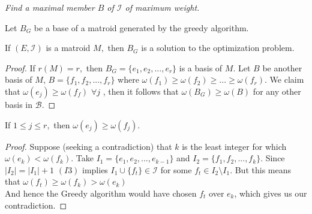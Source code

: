 \documentclass[../main.tex]{subfiles}
\begin{document}
\noindent\Problem \textit{Find a maximal member $B$ of $\mathcal{I}$ of maximum weight.}
\begin{note}
Let $B_G$ be a base of a matroid generated by the greedy algorithm.
\end{note}
\begin{thm}
If $(E,\mathcal{I})$ is a matroid $M,$ then $B_G$ is a solution to the optimization problem.
\end{thm}
\begin{proof}
If $r(M) = r,$ then $B_G = \{e_1,e_2, ..., e_r\}$ is a basis of $M.$ Let $B$ be another basis of $M$, $B = \{f_1, f_2, ..., f_r\}$
where $\omega(f_1) \geq \omega(f_2) \geq ... \geq \omega(f_r).$ We claim that $\omega(e_j) \geq \omega(f_f)$ $ \forall j$ , then it follows that $\omega(B_G) \geq \omega(B)$ for any other basis in $\mathcal{B}.$
\end{proof}

\begin{lem}
If $1 \leq j \leq r,$ then $\omega(e_j) \geq \omega(f_j).$
\end{lem}
\begin{proof}
Suppose (seeking a contradiction) that $k$ is the least integer for which $\omega(e_k) < \omega(f_k).$ Take $I_1 = \{e_1, e_2, ..., e_{k-1}\}$ and $I_2 = \{f_1, f_2, ..., f_{k}\}.$ Since $|I_2| = |I_1|+1$  $(I3)$ implies $I_1 \cup \{f_t\} \in \mathcal{I}$ for some $f_t \in I_2 \setminus I_1.$ But this means that $\omega(f_t) \geq \omega(f_k) > \omega(e_k)$\\ And hence the Greedy algorithm would have chosen $f_t$ over $e_k$, which gives us our contradiction.
\end{proof}
\end{document}
